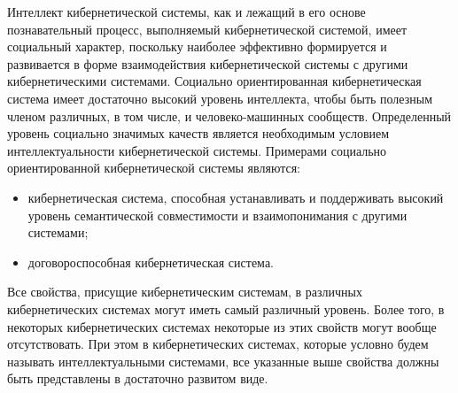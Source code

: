 Интеллект кибернетической системы, как и лежащий в его основе познавательный процесс, выполняемый кибернетической системой, имеет социальный характер, поскольку наиболее эффективно формируется и развивается в форме взаимодействия кибернетической системы с другими кибернетическими системами.
Социально ориентированная кибернетическая система имеет достаточно высокий уровень интеллекта, чтобы быть полезным членом различных, в том числе, и человеко-машинных сообществ.
Определенный уровень социально значимых качеств является необходимым условием интеллектуальности кибернетической системы.
Примерами социально ориентированной кибернетической системы являются:
\begin{itemize}
    \item{кибернетическая система, способная устанавливать и поддерживать высокий уровень семантической совместимости и взаимопонимания с другими системами;}
    \item{договороспособная кибернетическая система.}
\end{itemize}

Все свойства, присущие кибернетическим системам, в различных кибернетических системах могут иметь самый различный уровень.
Более того, в некоторых кибернетических системах некоторые из этих свойств могут вообще отсутствовать.
При этом в кибернетических системах, которые условно будем называть интеллектуальными системами, все указанные выше свойства должны быть представлены в достаточно развитом виде.